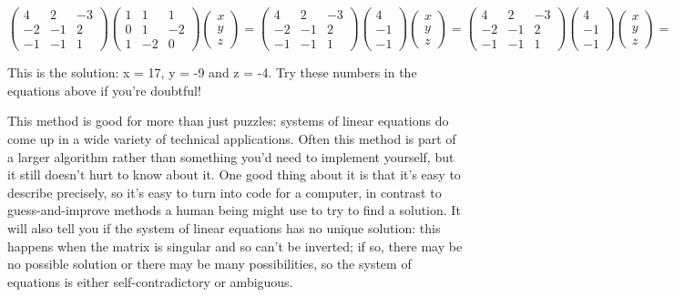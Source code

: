 \documentclass[oneside,english]{amsbook}
\numberwithin{section}{chapter}
\theoremstyle{plain}
\theoremstyle{definition}
\begin{document}
\[{\begin{pmatrix}
		4 & 2 & - 3 \\
		- 2 & - 1 & 2 \\
		- 1 & - 1 & 1
	\end{pmatrix}\begin{pmatrix}
		1 & 1 & 1 \\
		0 & 1 & - 2 \\
		1 & - 2 & 0
	\end{pmatrix}\begin{pmatrix}
		x \\
		y \\
		z
	\end{pmatrix} = \begin{pmatrix}
		4 & 2 & - 3 \\
		- 2 & - 1 & 2 \\
		- 1 & - 1 & 1
	\end{pmatrix}\begin{pmatrix}
		4 \\
		- 1 \\
		- 1
	\end{pmatrix}
}{\begin{pmatrix}
		x \\
		y \\
		z
	\end{pmatrix} = \begin{pmatrix}
		4 & 2 & - 3 \\
		- 2 & - 1 & 2 \\
		- 1 & - 1 & 1
	\end{pmatrix}\begin{pmatrix}
		4 \\
		- 1 \\
		- 1
	\end{pmatrix}
}{\begin{pmatrix}
		x \\
		y \\
		z
	\end{pmatrix} = \begin{pmatrix}
		17 \\
		- 9 \\
		- 4
\end{pmatrix}}\]

This is the solution: x = 17, y = -9 and z = -4. Try these numbers in
the equations above if you're doubtful!

This method is good for more than just puzzles: systems of linear
equations do come up in a wide variety of technical applications. Often
this method is part of a larger algorithm rather than something you'd
need to implement yourself, but it still doesn't hurt to know about it.
One good thing about it is that it's easy to describe precisely, so it's
easy to turn into code for a computer, in contrast to guess-and-improve
methods a human being might use to try to find a solution. It will also
tell you if the system of linear equations has no unique solution: this
happens when the matrix is singular and so can't be inverted; if so,
there may be no possible solution or there may be many possibilities, so
the system of equations is either self-contradictory or ambiguous.
\end{document}
